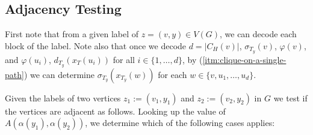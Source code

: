 \documentclass[kpfonts]{patmorin}
\newcommand{\itemref}[1]{(\ref{#1})}
\begin{document}
\subsection{Adjacency Testing}

First note that from a given label of $z=(v,y) \in V(G)$, we can decode each block of the label. 
Note also that once we decode $d=|C_H(v)|$, $\sigma_{T_y}(v)$, $\varphi(v)$, and $\varphi(u_i)$, $d_{T_y}(x_T(u_i))$ for all $i\in\{1,\dots,d\}$, by \itemref{itm:clique-on-a-single-path} we can determine $\sigma_{T_y}(x_{T_y}(w))$ for each $w\in\{v,u_1,\dots,u_d\}$.

Given the labels of two vertices $z_1:=(v_1,y_1)$ and $z_2:=(v_2,y_2)$ in $G$ we test if the vertices are adjacent as follows. 
Looking up the value of $A(\alpha(y_1),\alpha(y_2))$, we determine which of the following cases applies:
\end{document}

